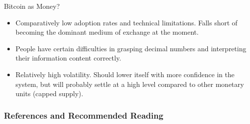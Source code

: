 \documentclass[]{beamer}
\begin{document}
\begin{frame}{Bitcoin as Money?}
	\begin{figure}
	\end{figure}
	\begin{itemize}
			\item<1-> Comparatively low adoption rates and technical limitations. Falls short of becoming the dominant medium of exchange at the moment.
			\item<2-> People have certain difficulties in grasping decimal numbers and interpreting their information content correctly.
			\item<3-> Relatively high volatility. Should lower itself with more confidence in the system, but will probably settle at a high level compared to other monetary units (capped supply).
	\end{itemize}
\end{frame}


\begin{frame}%
\frametitle{References and Recommended Reading}
	
	
\end{frame}
\end{document}
